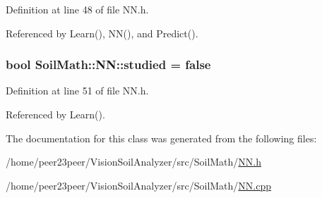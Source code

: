 Definition at line 48 of file N\+N.\+h.



Referenced by Learn(), N\+N(), and Predict().

\hypertarget{class_soil_math_1_1_n_n_aed36297c9221a837fee94f4774b614bf}{}
\subsubsection[{studied}]{\setlength{\rightskip}{0pt plus 5cm}bool Soil\+Math\+::\+N\+N\+::studied = false\hspace{0.3cm}{\ttfamily [private]}}\label{class_soil_math_1_1_n_n_aed36297c9221a837fee94f4774b614bf}


Definition at line 51 of file N\+N.\+h.



Referenced by Learn().



The documentation for this class was generated from the following files\+:\begin{DoxyCompactItemize}
\item 
/home/peer23peer/\+Vision\+Soil\+Analyzer/src/\+Soil\+Math/\hyperlink{_n_n_8h}{N\+N.\+h}\item 
/home/peer23peer/\+Vision\+Soil\+Analyzer/src/\+Soil\+Math/\hyperlink{_n_n_8cpp}{N\+N.\+cpp}\end{DoxyCompactItemize}
